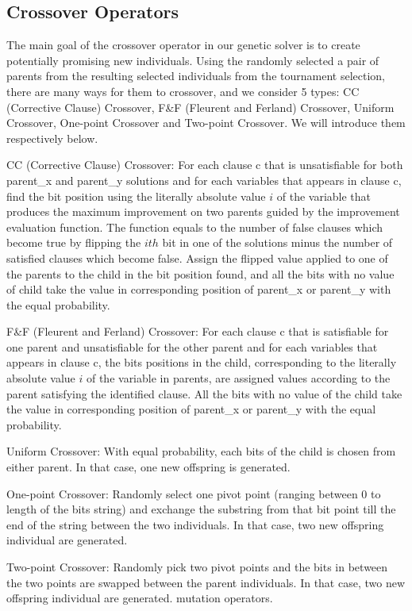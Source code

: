 \subsection{Crossover Operators}
The main goal of the crossover operator in our genetic solver is to create potentially promising new individuals. Using the randomly selected a pair of parents from the resulting selected individuals from the tournament selection, there are many ways for them to crossover, and we consider 5 types: CC (Corrective Clause) Crossover, F\&F (Fleurent and Ferland) Crossover, Uniform Crossover, One-point Crossover and Two-point Crossover. We will introduce them respectively below.

CC (Corrective Clause) Crossover:
For each clause c that is unsatisfiable for both parent\_x and parent\_y solutions and for each variables that appears in clause c, find the bit position using the literally absolute value $i$ of the variable that produces the maximum improvement on two parents guided by the improvement evaluation function. The function equals to the number of false clauses which become true by flipping the $ith$ bit in one of the solutions minus the number of satisfied clauses which become false. Assign the flipped value applied to one of the parents to the child in the bit position found, and all the bits with no value of child take the value in corresponding position of parent\_x or parent\_y with the equal probability.

F\&F (Fleurent and Ferland) Crossover:
For each clause c that is satisfiable for one parent and unsatisfiable for the other parent and for each variables that appears in clause c, the bits positions in the child, corresponding to the literally absolute value $i$ of the variable in parents, are assigned values according to the parent satisfying the identified clause. All the bits with no value of the child take the value in corresponding position of parent\_x or parent\_y with the equal probability.

Uniform Crossover:
With equal probability, each bits of the child is chosen from either parent. In that case, one new offspring is generated.

One-point Crossover:
Randomly select one pivot point (ranging between 0 to length of the bits string) and exchange the substring from that bit point till the end of the string between the two individuals. In that case, two new offspring individual are generated.

Two-point Crossover:
Randomly pick two pivot points and the bits in between the two points are swapped between the parent individuals. In that case, two new offspring individual are generated.
mutation operators.\\
